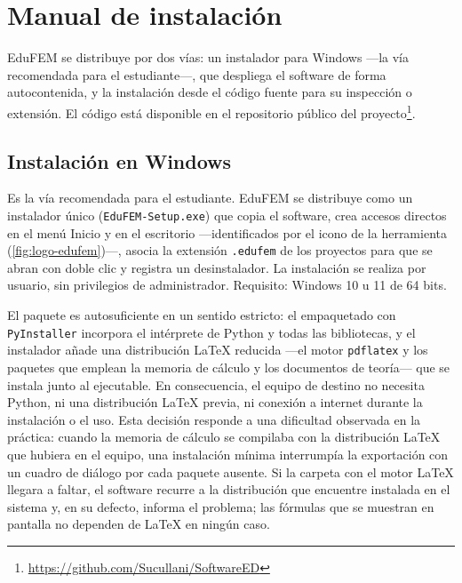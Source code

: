 
\chapter{Manual de instalación}
\label{anexo:instalacion}

EduFEM se distribuye por dos vías: un instalador para Windows —la vía recomendada para el estudiante—, que despliega el software de forma autocontenida, y la instalación desde el código fuente para su inspección o extensión. El código está disponible en el repositorio público del proyecto\footnote{\url{https://github.com/Sucullani/SoftwareED}}.

\section{Instalación en Windows}

Es la vía recomendada para el estudiante. EduFEM se distribuye como un instalador único (\texttt{EduFEM-Setup.exe}) que copia el software, crea accesos directos en el menú Inicio y en el escritorio —identificados por el icono de la herramienta (\autoref{fig:logo-edufem})—, asocia la extensión \texttt{.edufem} de los proyectos para que se abran con doble clic y registra un desinstalador. La instalación se realiza por usuario, sin privilegios de administrador. Requisito: Windows 10 u 11 de 64 bits.

El paquete es autosuficiente en un sentido estricto: el empaquetado con \texttt{PyInstaller} incorpora el intérprete de Python y todas las bibliotecas, y el instalador añade una distribución \LaTeX{} reducida —el motor \texttt{pdflatex} y los paquetes que emplean la memoria de cálculo y los documentos de teoría— que se instala junto al ejecutable. En consecuencia, el equipo de destino no necesita Python, ni una distribución \LaTeX{} previa, ni conexión a internet durante la instalación o el uso. Esta decisión responde a una dificultad observada en la práctica: cuando la memoria de cálculo se compilaba con la distribución \LaTeX{} que hubiera en el equipo, una instalación mínima interrumpía la exportación con un cuadro de diálogo por cada paquete ausente. Si la carpeta con el motor \LaTeX{} llegara a faltar, el software recurre a la distribución que encuentre instalada en el sistema y, en su defecto, informa el problema; las fórmulas que se muestran en pantalla no dependen de \LaTeX{} en ningún caso.

